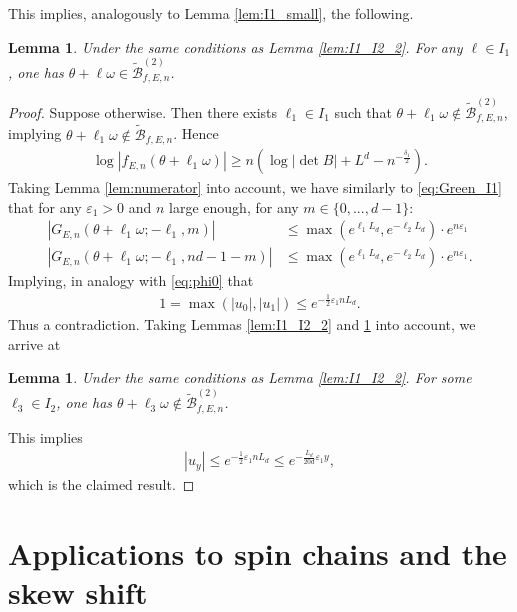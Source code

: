 \documentclass[11pt]{amsart}
\newtheorem{lemma}[theorem]{Lemma}
\begin{document}
This implies, analogously to Lemma \ref{lem:I1_small}, the following.
\begin{lemma}\label{lem:I1_small_2}
Under the same conditions as Lemma \ref{lem:I1_I2_2}.
For any $\ell\in I_1$, one has $\theta+\ell \omega\in \widetilde{\mathcal{B}}_{f,E,n}^{(2)}$.
\end{lemma}
\begin{proof}
    Suppose otherwise. Then there exists $\ell_1\in I_1$ such that $ \theta+\ell_1\omega \notin \widetilde{\mathcal{B}}_{f,E,n}^{(2)}$, implying $\theta+\ell_1\omega\notin \widetilde{\mathcal{B}}_{f,E,n}$.
    Hence
    \begin{align}
        \log |f_{E,n}(\theta+\ell_1\omega)|\geq n(\log |\det B|+L^d-n^{-\frac{\delta_1}{2}}).
    \end{align}
    Taking Lemma \ref{lem:numerator} into account, we have similarly to \eqref{eq:Green_I1} that for any $\varepsilon_1>0$ and $n$ large enough, for any $m\in \{0,...,d-1\}$:
    \begin{align}\label{eq:Green_I1_2}
        |G_{E,n}(\theta+\ell_1\omega;-\ell_1,m)|&\leq \max(e^{\ell_1 L_d}, e^{-\ell_2L_d})\cdot e^{n\varepsilon_1}\\
        |G_{E,n}(\theta+\ell_1\omega;-\ell_1,nd-1-m)|&\leq \max(e^{\ell_1L_d}, e^{-\ell_2L_d})\cdot e^{n\varepsilon_1}.
    \end{align}
Implying, in analogy with \eqref{eq:phi0} that
\begin{align}
    1=\max(|u_0|, |u_1|)\leq e^{-\frac{1}{2}\varepsilon_1 nL_d}.
\end{align}
Thus a contradiction. 
Taking Lemmas \ref{lem:I1_I2_2} and \ref{lem:I1_small_2} into account, we arrive at
\begin{lemma}
Under the same conditions as Lemma \ref{lem:I1_I2_2}.
For some $\ell_3\in I_2$, one has $\theta+\ell_3\omega \notin \widetilde{\mathcal{B}}_{f,E,n}^{(2)}$.   
\end{lemma}
This implies 
\begin{align}
    |u_y|\leq e^{-\frac{1}{2}\varepsilon_1 n L_d}\leq e^{-\frac{L_d}{20d}\varepsilon_1 y},
\end{align}
which is the claimed result.
\end{proof}

\section{Applications to spin chains and the skew shift}\label{sec:XY_sk}
\end{document}
